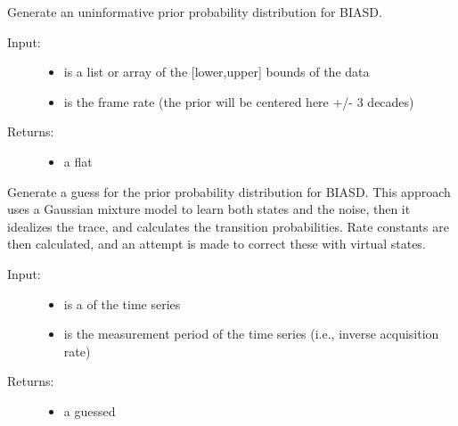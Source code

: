 \documentclass[letterpaper,10pt,english]{sphinxmanual}
\begin{document}
\begin{fulllineitems}
\label{code_distributions:distributions.uninformative_prior}
Generate an uninformative prior probability distribution for BIASD.
\begin{description}
\item[{Input:}] \leavevmode\begin{itemize}
\item {} 
 is a list or array of the {[}lower,upper{]} bounds of the data

\item {} 
 is the frame rate (the prior will be centered here +/- 3 decades)

\end{itemize}

\item[{Returns:}] \leavevmode\begin{itemize}
\item {} 
a flat 

\end{itemize}

\end{description}

\end{fulllineitems}


\begin{fulllineitems}
\label{code_distributions:distributions.guess_prior}
Generate a guess for the prior probability distribution for BIASD. This approach uses a Gaussian mixture model to learn both states and the noise, then it idealizes the trace, and calculates the transition probabilities. Rate constants are then calculated, and an attempt is made to correct these with virtual states.
\begin{description}
\item[{Input:}] \leavevmode\begin{itemize}
\item {} 
 is a  of the time series

\item {} 
 is the measurement period of the time series (i.e., inverse acquisition rate)

\end{itemize}

\item[{Returns:}] \leavevmode\begin{itemize}
\item {} 
a guessed 

\end{itemize}

\end{description}

\end{fulllineitems}
\end{document}
